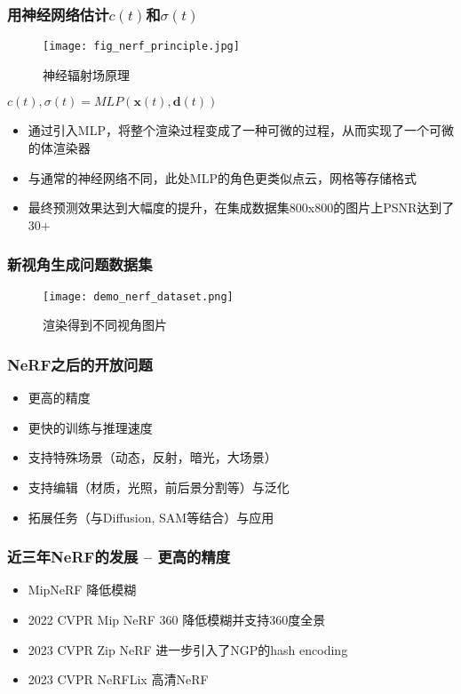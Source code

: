 

\begin{frame}
    \frametitle{用神经网络估计$c(t)$和$\sigma(t)$}
    \begin{figure}[H]
        \centering
        \texttt{[image: fig\_nerf\_principle.jpg]}
        \caption{神经辐射场原理}
        \label{fig:nerf_principle}
    \end{figure}
    $c(t),\sigma(t)=MLP(\mathbf{x}(t),\mathbf{d}(t))$
    \begin{itemize}
        \item 通过引入MLP，将整个渲染过程变成了一种可微的过程，从而实现了一个可微的体渲染器
        \item 与通常的神经网络不同，此处MLP的角色更类似点云，网格等存储格式
        \item 最终预测效果达到大幅度的提升，在集成数据集800x800的图片上PSNR达到了30+
    \end{itemize}
\end{frame}

\begin{frame}
    \frametitle{新视角生成问题数据集}
    \begin{figure}[H]
        \texttt{[image: demo\_nerf\_dataset.png]}
        \caption[short]{渲染得到不同视角图片}
    \end{figure}
\end{frame}

\begin{frame}
    \frametitle{NeRF之后的开放问题}
    \begin{itemize}
        \item 更高的精度
        \item 更快的训练与推理速度
        \item 支持特殊场景（动态，反射，暗光，大场景）
        \item 支持编辑（材质，光照，前后景分割等）与泛化
        \item 拓展任务（与Diffusion, SAM等结合）与应用
    \end{itemize}
\end{frame}

\begin{frame}
    \frametitle{近三年NeRF的发展 -- 更高的精度}
    \begin{itemize}
        \item MipNeRF \cite{barronMipNeRFMultiscaleRepresentation2021} 降低模糊
        \item 2022 CVPR Mip NeRF 360 \cite{barronMipNeRF360Unbounded2022} 降低模糊并支持360度全景
        \item 2023 CVPR Zip NeRF \cite{barronZipNeRFAntiAliasedGridBased2023} 进一步引入了NGP的hash encoding
        \item 2023 CVPR NeRFLix \cite{zhouNeRFLiXHighQualityNeural2023} 高清NeRF
    \end{itemize}
\end{frame}

